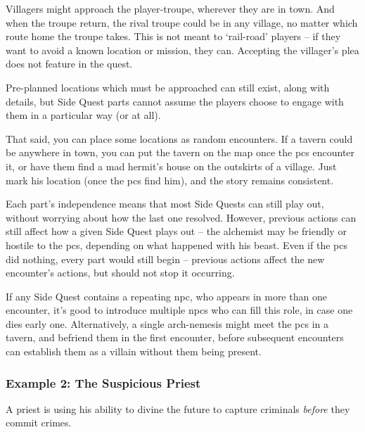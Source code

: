 \begin{multicols}{2}
\begin{enumerate}
\end{enumerate}

Villagers might approach the player-troupe, wherever they are in town.
And when the troupe return, the rival troupe could be in any village, no matter which route home the troupe takes.
This is not meant to `rail-road' players -- if they want to avoid a known location or mission, they can.
Accepting the villager's plea does not feature in the quest.

Pre-planned locations which must be approached can still exist, along with details, but Side Quest parts cannot assume the players choose to engage with them in a particular way (or at all).

That said, you can place some locations as random encounters.
If a tavern could be anywhere in town, you can put the tavern on the map once the \glspl{pc} encounter it, or have them find a mad hermit's house on the outskirts of a village.
Just mark his location (once the \glspl{pc} find him), and the story remains consistent.

Each part's independence means that most Side Quests can still play out, without worrying about how the last one resolved.
However, previous actions can still affect how a given Side Quest plays out -- the alchemist may be friendly or hostile to the \glspl{pc}, depending on what happened with his beast.
Even if the \glspl{pc} did nothing, every part would still begin -- previous actions affect the new encounter's actions, but should not stop it occurring.

If any Side Quest contains a repeating \gls{npc}, who appears in more than one encounter, it's good to introduce multiple \glspl{npc} who can fill this role, in case one dies early one.
Alternatively, a single arch-nemesis might meet the \glspl{pc} in a tavern, and befriend them in the first encounter, before subsequent encounters can establish them as a villain without them being present.

\subsubsection{Example 2: The Suspicious Priest}

\begin{exampletext}

A priest is using his ability to divine the future to capture criminals \emph{before} they commit crimes.

\end{exampletext}


\end{multicols}
